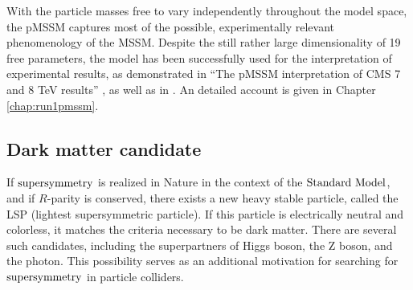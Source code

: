 With the particle masses free to vary independently throughout the model space, the pMSSM captures most of the possible, experimentally relevant phenomenology of the MSSM.  Despite the still rather large dimensionality of 19 free parameters, the model has been successfully used for the interpretation of experimental results, as demonstrated in ``The pMSSM interpretation of CMS 7 and 8 TeV results'' \cite{Khachatryan:2016nvf}, as well as in \cite{Carena:2012he, Aad:2015baa}. An detailed account is given in Chapter \ref{chap:run1pmssm}.

\subsection{Dark matter candidate}
If $\text{supersymmetry}$ is realized in Nature in the context of the $\text{Standard\ Model}$, and if $R$-parity is conserved, there exists a new heavy stable particle, called the LSP (lightest supersymmetric particle). If this particle is electrically neutral and colorless, it matches the criteria necessary to be dark matter. There are several such candidates, including the superpartners of Higgs boson, the Z boson, and the photon. This possibility serves as an additional motivation for searching for $\text{supersymmetry}$ in particle colliders. 
